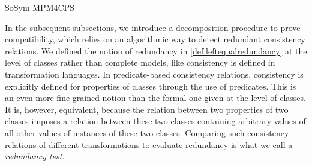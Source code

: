 \begin{copiedFrom}{SoSym MPM4CPS}

In the subsequent subsections, we introduce a decomposition procedure to prove compatibility, which relies on an algorithmic way to detect redundant consistency relations. 
We defined the notion of redundancy in \autoref{def:leftequalredundancy} at the level of classes rather than complete models, like consistency is defined in transformation languages.
In predicate-based consistency relations, consistency is explicitly defined for properties of classes through the use of predicates.
This is an even more fine-grained notion than the formal one given at the level of classes.
It is, however, equivalent, because the relation between two properties of two classes imposes a relation between these two classes containing arbitrary values of all other values of instances of these two classes.
Comparing such consistency relations of different transformations to evaluate redundancy is what we call a 
\textit{redundancy test}.


\end{copiedFrom}
